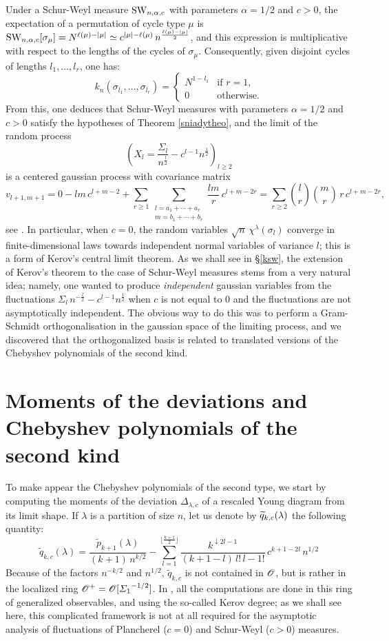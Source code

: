 \documentclass[10pt]{amsart}
\begin{document}
Under a Schur-Weyl measure $\mathrm{SW}_{n,\alpha,c}$ with parameters $\alpha=1/2$ and $c>0$, the expectation of a permutation of cycle type $\mu$ is $\mathrm{SW}_{n,\alpha,c}[\sigma_{\mu}]=N^{\ell(\mu)-|\mu|}\simeq c^{|\mu|-\ell(\mu)}\,n^{\frac{\ell(\mu)-|\mu|}{2}}$, and this expression is multiplicative with respect to the lengths of the cycles of $\sigma_{\mu}$. Consequently, given disjoint cycles of lengths $l_{1},\ldots,l_{r}$, one has:
$$k_{n}(\sigma_{l_{1}},\ldots,\sigma_{l_{r}})=\begin{cases}N^{1-l_{1}}&\text{if }r=1,\\ 0&\text{otherwise}.\end{cases}$$
From this, one deduces that Schur-Weyl measures with parameters $\alpha=1/2$ and $c>0$ satisfy the hypotheses of Theorem \ref{sniadytheo}, and the limit of the random process
$$\left(X_{l}=\frac{\varSigma_{l}}{n^{\frac{l}{2}}}-c^{l-1}n^{\frac{1}{2}}\right)_{l \geq 2}$$
is a centered gaussian process with covariance matrix
$$v_{l+1,m+1}=0-lm\,c^{l+m-2}+\sum_{r\geq 1}\sum_{\substack{l=a_{1}+\cdots+a_{r}\\ m=b_{1}+\cdots + b_{r}}} \frac{lm}{r} \,c^{l+m-2r}=\sum_{r\geq 2} \binom{l}{r}\binom{m}{r}\,r\,c^{l+m-2r},$$
see \cite[Example 6]{Sni06}. In particular, when $c=0$, the random variables $\sqrt{n}\,\chi^{\lambda}(\sigma_{l})$ converge in finite-dimensional laws towards independent normal variables of variance $l$; this is a form of Kerov's central limit theorem. As we shall see in \S\ref{ksw}, the extension of Kerov's theorem to the case of Schur-Weyl measures stems from a very natural idea; namely, one wanted to produce \emph{independent} gaussian variables from the fluctuations ${\varSigma_{l}}\,{n^{-\frac{l}{2}}}-c^{l-1}n^{\frac{1}{2}}$ when $c$ is not equal to $0$ and the fluctuations are not asymptotically independent. The obvious way to do this was to perform a Gram-Schmidt orthogonalisation in the gaussian space of the limiting process, and we discovered that the orthogonalized basis is related to translated versions of the Chebyshev polynomials of the second kind.
\bigskip
\bigskip


\section{Moments of the deviations and Chebyshev polynomials of the second kind}\label{core}
To make appear the Chebyshev polynomials of the second type, we start by computing the moments of the deviation $\Delta_{\lambda,c}$ of a rescaled Young diagram from its limit shape. If $\lambda$ is a partition of size $n$, let us denote by $\widetilde{q}_{k,c}(\lambda)$ the following quantity:
$$\widetilde{q}_{k,c}(\lambda)=\frac{\widetilde{p}_{k+1}(\lambda)}{(k+1)\,n^{k/2}}-\sum_{l=1}^{\lfloor\frac{k+1}{2}\rfloor} \frac{k^{\downarrow 2l-1}}{(k+1-l)\,l!\,l-1!}\,c^{k+1-2l}\,n^{1/2}$$
Because of the factors $n^{-k/2}$ and $n^{1/2}$, $\widetilde{q}_{k,c}$ is not contained in $\mathscr{O}$, but is rather in the localized ring $\mathscr{O}^{+}=\mathscr{O}[{\varSigma_{1}}^{-1/2}]$. In \cite{IO02}, all the computations are done in this ring of generalized observables, and using the so-called Kerov degree; as we shall see here, this complicated framework is not at all required for the asymptotic analysis of fluctuations of Plancherel ($c=0$) and Schur-Weyl ($c>0$) measures.
\end{document}
